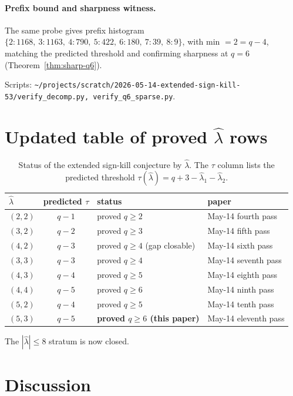 \documentclass[11pt]{article}
\theoremstyle{definition}
\newcommand{\hatl}{\widehat\lambda}
\begin{document}
\paragraph{Prefix bound and sharpness witness.}  The same probe gives
prefix histogram
$\{2: 1168,\ 3: 1163,\ 4: 790,\ 5: 422,\ 6: 180,\ 7: 39,\ 8: 9\}$,
with min $= 2 = q - 4$, matching the predicted threshold and
confirming sharpness at $q = 6$ (Theorem~\ref{thm:sharp-q6}).

Scripts:
\texttt{\textasciitilde/projects/scratch/2026-05-14-extended-sign-kill-53/verify\_decomp.py,
verify\_q6\_sparse.py}.

\section{Updated table of proved $\hatl$ rows}\label{sec:table}

\begin{table}[h]
\centering
\renewcommand{\arraystretch}{1.15}
\caption{Status of the extended sign-kill conjecture by $\hatl$.  The
$\tau$ column lists the predicted threshold $\tau(\hatl) = q + 3 -
\hatl_1 - \hatl_2$.}
\begin{tabular}{l|c|l|l}
\toprule
$\hatl$ & predicted $\tau$ & status & paper \\
\midrule
$(2, 2)$ & $q - 1$ & proved $q \ge 2$           & May-14 fourth pass \\
$(3, 2)$ & $q - 2$ & proved $q \ge 3$           & May-14 fifth pass \\
$(4, 2)$ & $q - 3$ & proved $q \ge 4$ (gap closable) & May-14 sixth pass \\
$(3, 3)$ & $q - 3$ & proved $q \ge 4$           & May-14 seventh pass \\
$(4, 3)$ & $q - 4$ & proved $q \ge 5$           & May-14 eighth pass \\
$(4, 4)$ & $q - 5$ & proved $q \ge 6$           & May-14 ninth pass \\
$(5, 2)$ & $q - 4$ & proved $q \ge 5$           & May-14 tenth pass \\
$(5, 3)$ & $q - 5$ & \textbf{proved $q \ge 6$ (this paper)} & May-14 eleventh pass \\
\bottomrule
\end{tabular}
\end{table}

The $|\hatl| \le 8$ stratum is now closed.

\section{Discussion}\label{sec:discussion}
\end{document}
